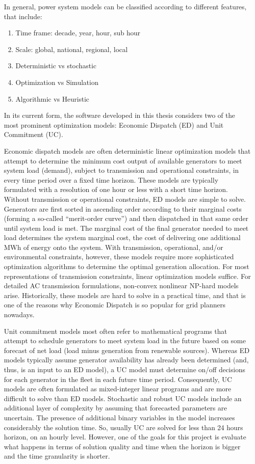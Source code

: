 \documentclass[12pt,LUDisStyle,twosided]{book}
\begin{document}
In general, power system models can be classified according to different features, that include:

\begin{enumerate}
\item Time frame: decade, year, hour, sub hour 
\item Scale: global, national, regional, local
\item Deterministic vs stochastic
\item Optimization vs Simulation
\item Algorithmic vs Heuristic
\end{enumerate}

In its current form, the software developed in this thesis considers two of the most prominent optimization models: Economic Dispatch (ED) and Unit Commitment (UC). 

Economic dispatch models are often deterministic linear optimization models that attempt to determine the minimum cost output of available generators to meet system load (demand), subject to transmission and operational constraints, in every time period over a fixed time horizon.  These models are typically formulated with a resolution of one hour or less with a short time horizon. Without transmission or operational constraints, ED models are simple to solve. Generators are first sorted in ascending order according to their marginal costs (forming a so-called ``merit-order curve'') and then dispatched in that same order until system load is met. The marginal cost of the final generator needed to meet load determines the system marginal cost, the cost of delivering one additional MWh of energy onto the system.  With transmission, operational, and/or environmental constraints, however, these models require more sophisticated optimization algorithms to determine the optimal generation allocation.  For most representations of transmission constraints, linear optimization models suffice.  For detailed AC transmission formulations, non-convex nonlinear NP-hard models arise. Historically, these models are hard to solve in a practical time, and that is one of the reasons why Economic Dispatch is so popular for grid planners nowadays.

Unit commitment models most often refer to mathematical programs that attempt to schedule generators to meet system load in the future based on some forecast of net load (load minus generation from renewable sources).  Whereas ED models typically assume generator availability has already been determined (and, thus, is an input to an ED model), a UC model must determine on/off decisions for each generator in the fleet in each future time period.  Consequently, UC models are often formulated as mixed-integer linear programs and are more difficult to solve than ED models.  Stochastic and robust UC models include an additional layer of complexity by assuming that forecasted parameters are uncertain. The presence of additional binary variables in the model increases considerably the solution time. So, usually UC are solved for less than 24 hours horizon, on an hourly level. However, one of the goals for this project is evaluate what happens in terms of solution quality and time when the horizon is bigger and the time granularity is shorter.
\end{document}
